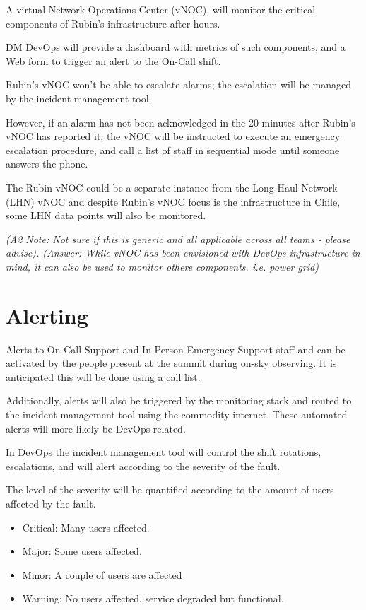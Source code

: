 A virtual Network Operations Center (vNOC), will monitor the critical components of Rubin's infrastructure after hours.

DM DevOps will provide a dashboard with metrics of such components, and a Web form to trigger an alert to the On-Call shift.

Rubin's vNOC won't be able to escalate alarms; the escalation will be managed by the incident management tool.

However, if an alarm has not been acknowledged in the 20 minutes after Rubin's vNOC has reported it, the vNOC will be instructed to execute an emergency escalation procedure, and call a list of staff in sequential mode until someone answers the phone.

The Rubin vNOC could be a separate instance from the Long Haul Network (LHN) vNOC and despite Rubin's vNOC focus is the infrastructure in Chile, some LHN data points will also be monitored.

\textit{
(A2 Note:  Not sure if this is generic and all applicable across all teams - please advise).
(Answer: While vNOC has been envisioned with DevOps infrastructure in mind, it can also be used to monitor othere components. i.e. power grid)}

\section{Alerting}

Alerts to On-Call Support and In-Person Emergency Support staff and can be activated by the people present at the summit during on-sky observing.  It is anticipated this will be done using a call list.

Additionally, alerts will also be triggered by the monitoring stack and routed to the incident management tool using the commodity internet.  These automated alerts will more likely be DevOps related.

In DevOps the incident management tool will control the shift rotations, escalations, and will alert according to the severity of the fault.

The level of the severity will be quantified according to the amount of users affected by the fault.

\begin{itemize}
    \item Critical: Many users affected.
    \item Major: Some users affected.
    \item Minor: A couple of users are affected
    \item Warning: No users affected, service degraded but functional.
\end{itemize}

